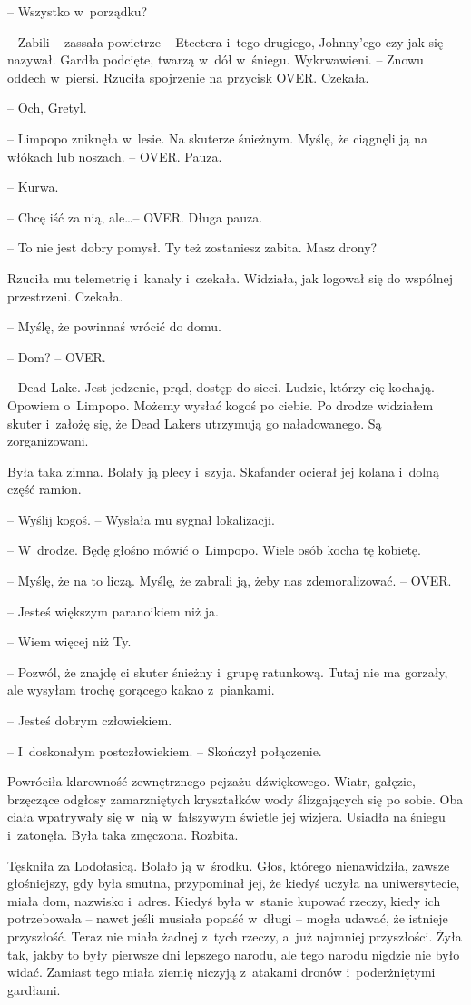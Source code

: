 \documentclass[oneside,polish,11pt,sfheadings]{mwbk}
\begin{document}
-- Wszystko w~porządku?

-- Zabili -- zassała powietrze -- Etcetera i~tego drugiego, Johnny'ego czy
jak się nazywał. Gardła podcięte, twarzą w~dół w~śniegu. Wykrwawieni. -- Znowu oddech w~piersi. Rzuciła spojrzenie na przycisk OVER. Czekała.

-- Och, Gretyl.

-- Limpopo zniknęła w~lesie. Na skuterze śnieżnym. Myślę, że ciągnęli ją
na włókach lub noszach. -- OVER. Pauza.

-- Kurwa.

-- Chcę iść za nią, ale\ldots  -- OVER. Długa pauza.

-- To nie jest dobry pomysł. Ty też zostaniesz zabita. Masz drony?

Rzuciła mu telemetrię i~kanały i~czekała. Widziała, jak logował się do
wspólnej przestrzeni. Czekała.

-- Myślę, że powinnaś wrócić do domu.

-- Dom? -- OVER.

-- Dead Lake. Jest jedzenie, prąd, dostęp do sieci. Ludzie, którzy cię
kochają. Opowiem o~Limpopo. Możemy wysłać kogoś po ciebie. Po drodze
widziałem skuter i~założę się, że Dead Lakers utrzymują go naładowanego.
Są zorganizowani.

Była taka zimna. Bolały ją plecy i~szyja. Skafander ocierał jej kolana i~dolną część ramion.

-- Wyślij kogoś. -- Wysłała mu sygnał lokalizacji.

-- W~drodze. Będę głośno mówić o~Limpopo. Wiele osób kocha tę kobietę.

-- Myślę, że na to liczą. Myślę, że zabrali ją, żeby nas zdemoralizować.
-- OVER.

-- Jesteś większym paranoikiem niż ja.

-- Wiem więcej niż Ty.

-- Pozwól, że znajdę ci skuter śnieżny i~grupę ratunkową. Tutaj nie ma
gorzały, ale wysyłam trochę gorącego kakao z~piankami.

-- Jesteś dobrym człowiekiem.

-- I~doskonałym postczłowiekiem. -- Skończył połączenie.

Powróciła klarowność zewnętrznego pejzażu dźwiękowego. Wiatr, gałęzie,
brzęczące odgłosy zamarzniętych kryształków wody ślizgających się po
sobie. Oba ciała wpatrywały się w~nią w~fałszywym świetle jej wizjera.
Usiadła na śniegu i~zatonęła. Była taka zmęczona. Rozbita.

Tęskniła za Lodołasicą. Bolało ją w~środku. Głos, którego nienawidziła,
zawsze głośniejszy, gdy była smutna, przypominał jej, że kiedyś uczyła
na uniwersytecie, miała dom, nazwisko i~adres. Kiedyś była w~stanie
kupować rzeczy, kiedy ich potrzebowała -- nawet jeśli musiała popaść w~długi -- mogła udawać, że istnieje przyszłość. Teraz nie miała żadnej z~tych rzeczy, a~już najmniej przyszłości. Żyła tak, jakby to były
pierwsze dni lepszego narodu, ale tego narodu nigdzie nie było widać.
Zamiast tego miała ziemię niczyją z~atakami dronów i~poderżniętymi
gardłami.
\end{document}
